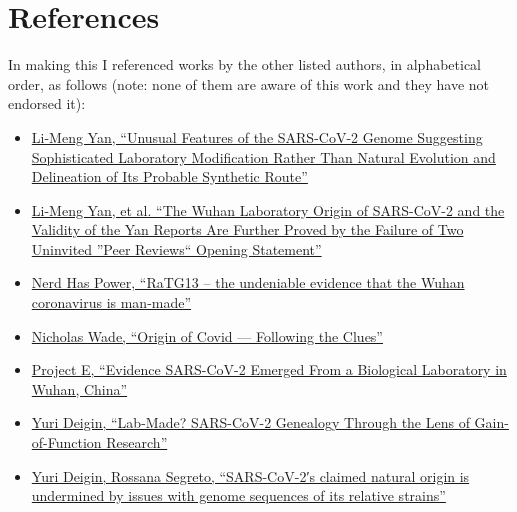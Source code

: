 \documentclass[11pt]{article}
\begin{document}
\section{References}
\label{sec:org609fa13}
In making this I referenced works by the other listed authors, in alphabetical order, as follows (note: none of them are aware of this work and they have not endorsed it):
\begin{itemize}
\item \href{https://www.researchgate.net/publication/344240007\_Unusual\_Features\_of\_the\_SARS-CoV-2\_Genome\_Suggesting\_Sophisticated\_Laboratory\_Modification\_Rather\_Than\_Natural\_Evolution\_and\_Delineation\_of\_Its\_Probable\_Synthetic\_Route}{Li-Meng Yan, ``Unusual Features of the SARS-CoV-2 Genome Suggesting Sophisticated Laboratory Modification Rather Than Natural Evolution and Delineation of Its Probable Synthetic Route''}
\item \href{https://www.researchgate.net/publication/350523980\_The\_Wuhan\_Laboratory\_Origin\_of\_SARS-CoV-2\_and\_the\_Validity\_of\_the\_Yan\_Reports\_Are\_Further\_Proved\_by\_the\_Failure\_of\_Two\_Uninvited\_Peer\_Reviews\_Opening\_Statement}{Li-Meng Yan, et al. ``The Wuhan Laboratory Origin of SARS-CoV-2 and the Validity of the Yan Reports Are Further Proved by the Failure of Two Uninvited ''Peer Reviews`` Opening Statement''}
\item \href{https://nerdhaspower.weebly.com/ratg13-is-fake.html}{Nerd Has Power, ``RaTG13 – the undeniable evidence that the Wuhan coronavirus is man-made''}
\item \href{https://nicholaswade.medium.com/origin-of-covid-following-the-clues-6f03564c038}{Nicholas Wade, ``Origin of Covid — Following the Clues''}
\item \href{https://project-evidence.github.io/}{Project E, ``Evidence SARS-CoV-2 Emerged From a Biological Laboratory in Wuhan, China''}
\item \href{https://yurideigin.medium.com/lab-made-cov2-genealogy-through-the-lens-of-gain-of-function-research-f96dd7413748}{Yuri Deigin, ``Lab-Made? SARS-CoV-2 Genealogy Through the Lens of Gain-of-Function Research''}
\item \href{https://onlinelibrary.wiley.com/doi/pdfdirect/10.1002/bies.202100015}{Yuri Deigin, Rossana Segreto, ``SARS-CoV-2′s claimed natural origin is undermined by issues with genome sequences of its relative strains''}
\end{itemize}
\end{document}
